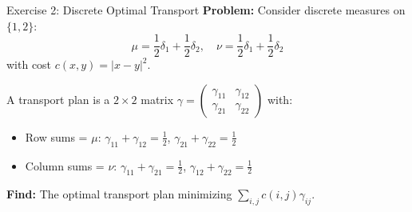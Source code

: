\documentclass[aspectratio=169]{beamer}
\begin{document}
\begin{frame}{Exercise 2: Discrete Optimal Transport}
\textbf{Problem:} Consider discrete measures on $\{1, 2\}$:
\[
\mu = \frac{1}{2}\delta_1 + \frac{1}{2}\delta_2, \quad \nu = \frac{1}{2}\delta_1 + \frac{1}{2}\delta_2
\]
with cost $c(x,y) = |x-y|^2$.

\vspace{0.3cm}
A transport plan is a $2 \times 2$ matrix $\gamma = \begin{pmatrix} \gamma_{11} & \gamma_{12} \\ \gamma_{21} & \gamma_{22} \end{pmatrix}$ with:
\begin{itemize}
    \item Row sums = $\mu$: $\gamma_{11} + \gamma_{12} = \frac{1}{2}$, $\gamma_{21} + \gamma_{22} = \frac{1}{2}$
    \item Column sums = $\nu$: $\gamma_{11} + \gamma_{21} = \frac{1}{2}$, $\gamma_{12} + \gamma_{22} = \frac{1}{2}$
\end{itemize}

\vspace{0.3cm}
\textbf{Find:} The optimal transport plan minimizing $\sum_{i,j} c(i,j)\gamma_{ij}$.
\end{frame}
\end{document}
